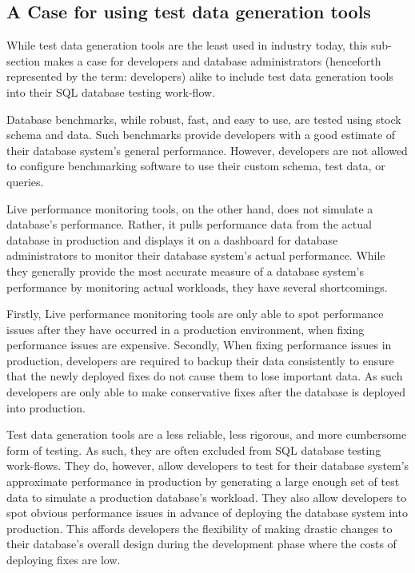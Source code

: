 \documentclass[12pt]{article}
\begin{document}
\begin{spacing}{1.9}
		
		
		
		\subsection{A Case for using test data generation tools}
		While test data generation tools are the least used in industry today, this sub-section makes a case for developers and database administrators (henceforth represented by the term: developers) alike to include test data generation tools into their SQL database testing work-flow.
		
		Database benchmarks, while robust, fast, and easy to use, are tested using stock schema and data. Such benchmarks provide developers with a good estimate of their database system’s general performance. However, developers are not allowed to configure benchmarking software to use their custom schema, test data, or queries.
		
		Live performance monitoring tools, on the other hand, does not simulate a database’s performance. Rather, it pulls performance data from the actual database in production and displays it on a dashboard for database administrators to monitor their database system’s actual performance. While they generally provide the most accurate measure of a database system’s performance by monitoring actual workloads, they have several shortcomings.
		
		Firstly, Live performance monitoring tools are only able to spot performance issues after they have occurred in a production environment, when fixing performance issues are expensive. Secondly, When fixing performance issues in production, developers are required to backup their data consistently to ensure that the newly deployed fixes do not cause them to lose important data. As such developers are only able to make conservative fixes after the database is deployed into production.
		
		Test data generation tools are a less reliable, less rigorous, and more cumbersome form of testing. As such, they are often excluded from SQL database testing work-flows. They do, however, allow developers to test for their database system’s approximate performance in production by generating a large enough set of test data to simulate a production database’s workload. They also allow developers to spot obvious performance issues in advance of deploying the database system into production. This affords developers the flexibility of making drastic changes to their database’s overall design during the development phase where the costs of deploying fixes are low.
		

\end{spacing}
\end{document}
